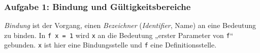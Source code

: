 \documentclass{beamer}
\date{2016-11-07/08}
\begin{document}
\normalsize
\normalem

\begin{frame}[plain]
  \titlepage
\end{frame}

\begin{frame}[fragile]
  \frametitle{Aufgabe 1: Bindung und Gültigkeitsbereiche}
  \emph{Bindung} ist der Vorgang, einen \emph{Bezeichner} (\emph{Identifier}, Name) an eine Bedeutung zu binden.
  In \lstinline{f x = 1} wird \lstinline{x} an die Bedeutung „erster Parameter von \lstinline{f}“ gebunden.
  \lstinline{x} ist hier eine Bindungsstelle und \lstinline{f} eine Definitionsstelle.
\end{frame}
\end{document}

